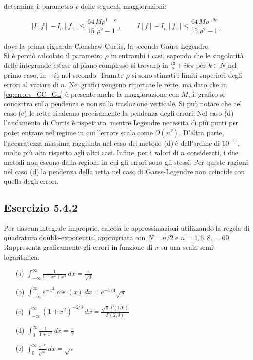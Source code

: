 \documentclass[letterpaper, 12pt]{article}
\begin{document}
determina il parametro $\rho$ delle seguenti maggiorazioni:

\begin{equation}
    \label{eq:errors_CC_GL}
    |I[f]-I_n[f]| \leq \frac{64}{15} \frac{M\rho^{1-n}}{\rho^2-1}\,, \qquad |I[f]-I_n[f]| \leq \frac{64}{15} \frac{M\rho^{-2n}}{\rho^2-1}\,.
    \end{equation}

dove la prima riguarda Clenshaw-Curtis, la seconda Gauss-Legendre.\\
Si è perciò calcolato il parametro $\rho$ in entrambi i casi, sapendo che le singolarità delle integrande estese
al piano complesso si trovano in $\frac{i \pi}{2} + ik\pi$ per $k \in N$ nel primo caso, in $\pm i\frac{1}{3}$
nel secondo. Tramite $\rho$ si sono stimati i limiti superiori degli errori al variare di $n$. Nei grafici 
vengono riportate le rette, ma dato che in \ref{eq:errors_CC_GL} è presente anche la maggiorazione con $M$, 
il grafico si concentra sulla pendenza e non sulla traslazione verticale. Si può notare che nel caso (c) 
le rette ricalcano precisamente la pendenza degli errori. Nel caso (d) l'andamento di Curtis è rispettato, mentre 
Legendre necessita di più punti per poter entrare nel regime in cui l'errore scala come $O(n^2)$. D'altra parte, 
l'accuratezza massima raggiunta nel caso del metodo (d) è dell'ordine di $10^{-11}$, molto più alta rispetto
agli altri casi. Infine, per i valori di $n$ considerati, i due metodi non escono dalla regione in cui gli
errori sono gli stessi. Per queste ragioni nel caso (d) la pendenza della retta nel caso di Gauss-Legendre
non coincide con quella degli errori. \\

\subsection{Esercizio 5.4.2}
Per ciascun integrale improprio, calcola le approssimazioni utilizzando la regola di quadratura double-exponential 
appropriata con $N=n/2$ e $n=4,6,8,\ldots,60$. Rappresenta graficamente gli errori in funzione di $n$ 
su una scala semi-logaritmica.

\begin{itemize}
    \item[(a)] $\displaystyle\int_{-\infty}^\infty \frac{1}{1+x^2+x^4}\, dx = \frac{\pi}{\sqrt{3}}$
    \item[(b)] $\displaystyle\int_{-\infty}^\infty e^{-x^2}\cos(x)\, dx = e^{-1/4}\sqrt{\pi}$
    \item[(c)] $\displaystyle\int_{-\infty}^\infty (1+x^2)^{-2/3}\, dx = \frac{\sqrt{\pi}\,\Gamma(1/6)}{\Gamma(2/3)}$
    \item[(d)] $\displaystyle \int_{0}^{\infty} \frac{1}{1+x^2}\,dx = \frac{\pi}{2}$
    \item[(e)] $\displaystyle \int_0^\infty \frac{e^{-x}}{\sqrt{x}}\,dx = \sqrt{\pi}$
\end{itemize}
\end{document}
